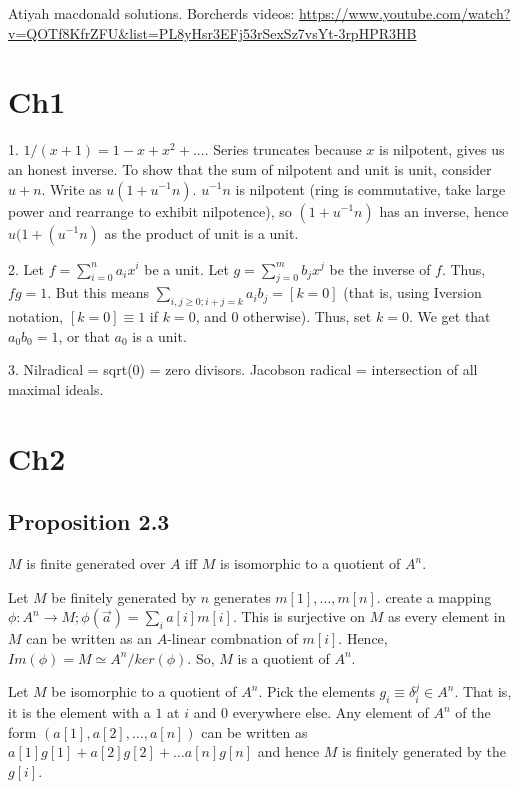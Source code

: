 \documentclass{book}
\begin{document}
Atiyah macdonald solutions. Borcherds videos:
\url{https://www.youtube.com/watch?v=QOTf8KfrZFU&list=PL8yHsr3EFj53rSexSz7vsYt-3rpHPR3HB}

\chapter{Ch1}

1. $1/(x+1) = 1 - x + x^2 + ...$. Series truncates because $x$ is nilpotent,
   gives us an honest inverse. To show that the sum of nilpotent and unit is
   unit, consider $u + n$. Write as $u(1 + u^{-1}n)$. $u^{-1}n$ is nilpotent
   (ring is commutative, take large power and rearrange to exhibit nilpotence), so $(1 + u^{-1}n)$ has an inverse,
   hence $u(1 + (u^{-1}n)$ as the product of unit is a unit.

2. Let $f = \sum_{i=0}^n a_i x^i$ be a unit. Let $g = \sum_{j=0}^m b_j x^j$ be the inverse of $f$.
   Thus, $fg = 1$. But this means $\sum_{i,j \geq 0; i + j = k} a_i b_j = [k = 0]$ (that is, using
   Iversion notation, $[k = 0] \equiv 1$ if $k = 0$, and $0$ otherwise).
   Thus, set $k = 0$. We get that $a_0 b_0 = 1$, or that $a_0$ is a unit.

3. Nilradical = sqrt(0) = zero divisors. Jacobson radical = intersection of all maximal ideals.

\chapter{Ch2}

\section{Proposition 2.3}
$M$ is finite generated over $A$ iff $M$ is isomorphic to a quotient of $A^n$.

Let $M$ be finitely generated by $n$ generates $m[1], \dots, m[n]$. create a mapping
$\phi: A^n \rightarrow M; \phi(\vec a) = \sum_i a[i] m[i]$. This is surjective on $M$
as every element in $M$ can be written as an $A$-linear combnation of $m[i]$. Hence,
$Im(\phi) = M \simeq A^n/ker(\phi)$. So, $M$ is a quotient of $A^n$.


Let $M$ be isomorphic to a quotient of $A^n$. Pick the elements $g_i \equiv \delta_i^j \in A^n$.
That is, it is the element with a $1$ at $i$ and $0$ everywhere else. Any element of $A^n$
of the form $(a[1], a[2], \dots, a[n])$ can be written as $a[1]g[1] + a[2]g[2] + \dots a[n]g[n]$
and hence $M$ is finitely generated by the $g[i]$.
\end{document}

